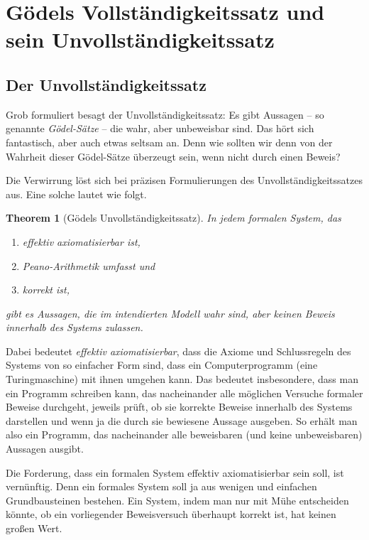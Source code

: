\documentclass[twoside]{../zirkelblatt1415}
\theoremstyle{definition}
\theoremstyle{plain}
\newtheorem{thm}[defn]{Theorem}
\theoremstyle{remark}
\begin{document}
\newpage


\section{Gödels Vollständigkeitssatz und sein Unvollständigkeitssatz}

\subsection{Der Unvollständigkeitssatz}

Grob formuliert besagt der Unvollständigkeitssatz: Es gibt Aussagen -- so
genannte \emph{Gödel-Sätze} -- die wahr, aber unbeweisbar sind. Das hört sich
fantastisch, aber auch etwas seltsam an. Denn wie sollten wir denn von der
Wahrheit dieser Gödel-Sätze überzeugt sein, wenn nicht durch einen Beweis?

Die Verwirrung löst sich bei präzisen Formulierungen des
Unvollständigkeitssatzes aus. Eine solche lautet wie folgt.

\begin{thm}[Gödels Unvollständigkeitssatz]In jedem formalen System, das
\begin{enumerate}
\item effektiv axiomatisierbar ist,
\item Peano-Arithmetik umfasst und
\item korrekt ist,
\end{enumerate}
gibt es Aussagen, die im intendierten Modell wahr sind, aber keinen Beweis
innerhalb des Systems zulassen.
\end{thm}

Dabei bedeutet \emph{effektiv axiomatisierbar}, dass die Axiome und
Schlussregeln des Systems von so einfacher Form sind, dass ein Computerprogramm
(eine Turingmaschine) mit ihnen umgehen kann. Das bedeutet insbesondere, dass
man ein Programm schreiben kann, das nacheinander alle möglichen Versuche
formaler Beweise durchgeht, jeweils prüft, ob sie korrekte Beweise innerhalb des
Systems darstellen und wenn ja die durch sie bewiesene Aussage ausgeben. So
erhält man also ein Programm, das nacheinander alle beweisbaren (und keine
unbeweisbaren) Aussagen ausgibt.

Die Forderung, dass ein formalen System effektiv axiomatisierbar sein soll, ist
vernünftig. Denn ein formales System soll ja aus wenigen und einfachen
Grundbausteinen bestehen. Ein System, indem man nur mit Mühe entscheiden
könnte, ob ein vorliegender Beweisversuch überhaupt korrekt ist, hat keinen
großen Wert.
\end{document}
